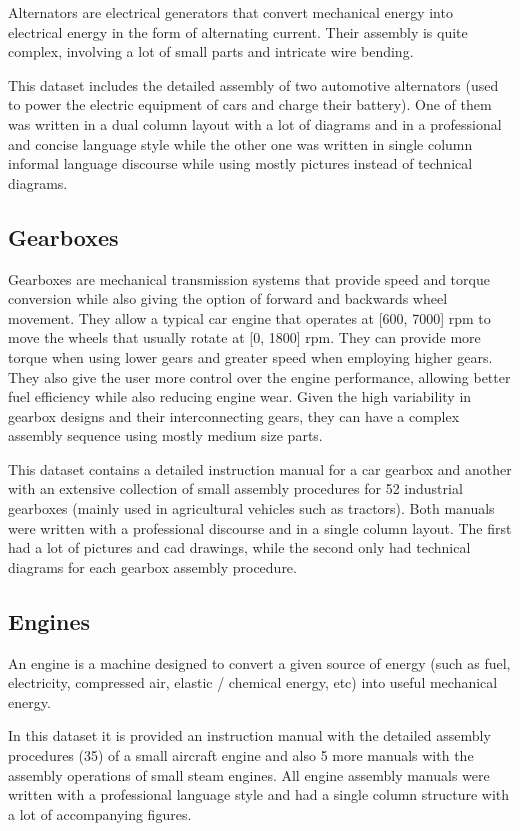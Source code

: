 Alternators are electrical generators that convert mechanical energy into electrical energy in the form of alternating current. Their assembly is quite complex, involving a lot of small parts and intricate wire bending.

This dataset includes the detailed assembly of two automotive alternators (used to power the electric equipment of cars and charge their battery). One of them was written in a dual column layout with a lot of diagrams and in a professional and concise language style while the other one was written in single column informal language discourse while using mostly pictures instead of technical diagrams.


\subsection{Gearboxes}

Gearboxes are mechanical transmission systems that provide speed and torque conversion while also giving the option of forward and backwards wheel movement. They allow a typical car engine that operates at [600, 7000] \gls{rpm} to move the wheels that usually rotate at [0, 1800] \gls{rpm}. They can provide more torque when using lower gears and greater speed when employing higher gears. They also give the user more control over the engine performance, allowing better fuel efficiency while also reducing engine wear. Given the high variability in gearbox designs and their interconnecting gears, they can have a complex assembly sequence using mostly medium size parts.

This dataset contains a detailed instruction manual for a car gearbox and another with an extensive collection of small assembly procedures for 52 industrial gearboxes (mainly used in agricultural vehicles such as tractors). Both manuals were written with a professional discourse and in a single column layout. The first had a lot of pictures and \gls{cad} drawings, while the second only had technical diagrams for each gearbox assembly procedure.


\subsection{Engines}

An engine is a machine designed to convert a given source of energy (such as fuel, electricity, compressed air, elastic / chemical energy, etc) into useful mechanical energy.

In this dataset it is provided an instruction manual with the detailed assembly procedures (35) of a small aircraft engine and also 5 more manuals with the assembly operations of small steam engines. All engine assembly manuals were written with a professional language style and had a single column structure with a lot of accompanying figures.
